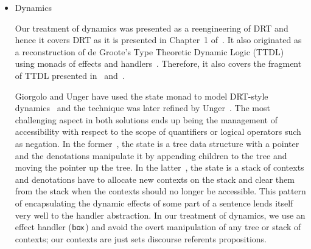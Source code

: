 \begin{itemize}
  We use deixis as the first example in
  Chapter~\ref{chap:introducing-effects}. Wanting to give an example of a
  handler for $\op{speaker}$ that appears within a lexical entry, we turned
  to direct quotations. However, the meanings that we give to sentences
  such as Example~\ref{ex:mary-peter} only express part of the
  meaning. Namely, we capture the fact Peter claims that Mary kissed
  him. Nevertheless, the sentence also entails that Peter uttered the
  sentence ``Mary kissed me''. Therefore, in our analysis, the sentence in
  Example~\ref{ex:mary-peter} would be judged equivalent to the sentence in
  Example~\ref{ex:peter-mary}. The meaning of direct quotation does not
  depend only on the meaning of the quoted clause, but on its exact
  form. Since our system is strictly compositional,\footnote{We are using
    abstract categorial grammars for the syntax-semantics interface.} we
  would need to make it so that the meaning of every sentence is the
  sentence itself. More elaborate treatments of quotation can be found
  in~\cite{geurts2003quotation,potts2007dimensions,shan2010character}.

  \begin{exe}
    \ex Peter said ``Mary kissed me''. \label{ex:mary-peter}
    \ex Peter said ``I was kissed by Mary''. \label{ex:peter-mary}
  \end{exe}

  
\item Dynamics

  Our treatment of dynamics was presented as a reengineering of DRT and
  hence it covers DRT as it is presented in Chapter~1
  of~\cite{kamp1993discourse}. It also originated as a reconstruction of de
  Groote's Type Theoretic Dynamic Logic
  (TTDL)~\cite{de2006towards,lebedeva2012expression} using monads of
  effects and handlers~\cite{marsik2014algebraic}. Therefore, it also
  covers the fragment of TTDL presented in~\cite{de2006towards}
  and~\cite{lebedeva2012expression}.

  Giorgolo and Unger have used the state monad to model DRT-style
  dynamics~\cite{giorgolo2009coreference} and the technique was later
  refined by Unger~\cite{unger2012dynamic}. The most challenging aspect in
  both solutions ends up being the management of accessibility with respect
  to the scope of quantifiers or logical operators such as negation. In the
  former~\cite{giorgolo2009coreference}, the state is a tree data structure
  with a pointer and the denotations manipulate it by appending children to
  the tree and moving the pointer up the tree. In the
  latter~\cite{unger2012dynamic}, the state is a stack of contexts and
  denotations have to allocate new contexts on the stack and clear them
  from the stack when the contexts should no longer be accessible. This
  pattern of encapsulating the dynamic effects of some part of a sentence
  lends itself very well to the handler abstraction. In our treatment of
  dynamics, we use an effect handler ($\mathsf{box}$) and avoid the overt
  manipulation of any tree or stack of contexts; our contexts are just sets
  discourse referents propositions.



\end{itemize}

